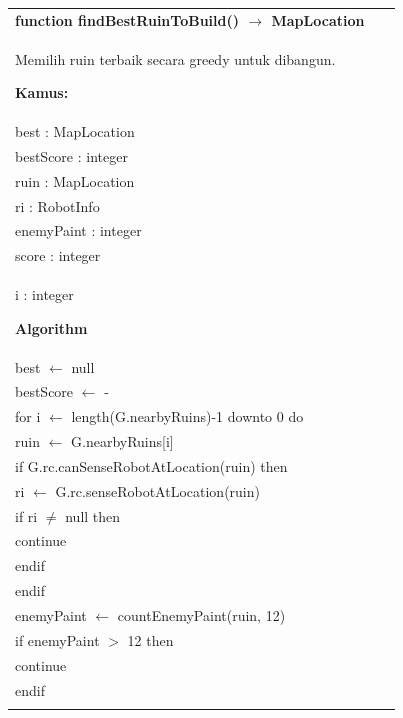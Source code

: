 \documentclass{article}
\newenvironment{pseudobox}
{
\centering
\begin{longtable}{|p{0.94\linewidth}|}
\hline
}
{
\\ \hline
\end{longtable}
\vspace{0.05cm}
}
\begin{document}
\begin{pseudobox}
\textbf{function findBestRuinToBuild() $\rightarrow$ MapLocation} \\
{ Memilih ruin terbaik secara greedy untuk dibangun. }

\textbf{Kamus:} \\
\hspace*{1em} best : MapLocation \\
\hspace*{1em} bestScore : integer \\
\hspace*{1em} ruin : MapLocation \\
\hspace*{1em} ri : RobotInfo \\
\hspace*{1em} enemyPaint : integer \\
\hspace*{1em} score : integer \\
\hspace*{1em} i : integer

\textbf{Algorithm} \\
\hspace*{1em} best $\leftarrow$ null \\
\hspace*{1em} bestScore $\leftarrow$ -\infty \\

\hspace*{1em} for i $\leftarrow$ length(G.nearbyRuins)-1 downto 0 do \\
\hspace*{2em} ruin $\leftarrow$ G.nearbyRuins[i] \\

\hspace*{2em} if G.rc.canSenseRobotAtLocation(ruin) then \\
\hspace*{3em} ri $\leftarrow$ G.rc.senseRobotAtLocation(ruin) \\
\hspace*{3em} if ri $\neq$ null then \\
\hspace*{4em} continue \\
\hspace*{3em} endif \\
\hspace*{2em} endif \\

\hspace*{2em} enemyPaint $\leftarrow$ countEnemyPaint(ruin, 12) \\
\hspace*{2em} if enemyPaint $>$ 12 then \\
\hspace*{3em} continue \\
\hspace*{2em} endif \\


\end{pseudobox}
\end{document}
